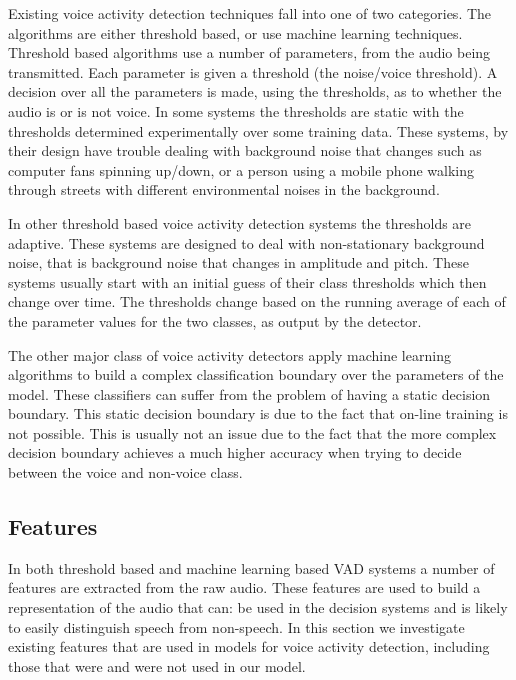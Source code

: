 \documentclass[ %
                    author={Sam Phippen},
                supervisor={Dr. Rafal Bogacz},
                     title={Real time voice activity detectors in noisy personal computing environments},
                  subtitle={},
                    degree={MEng},
                      year={2012} ]{thesis}
\begin{document}
Existing voice activity detection techniques fall into one of two categories.
The algorithms are either threshold based, or use machine learning techniques.
Threshold based algorithms use a number of parameters, from the audio being
transmitted. Each parameter is given a threshold (the noise/voice threshold). A
decision over all the parameters is made, using the thresholds, as to whether
the audio is or is not voice. In some systems the thresholds are static with
the thresholds determined experimentally over some training data\cite{haigh}.
These systems, by their design have trouble dealing with background noise that
changes such as computer fans spinning up/down, or a person using a mobile
phone walking through streets with different environmental noises in the
background.

In other threshold based voice activity detection systems the thresholds are
adaptive\cite{gokhun}. These systems are designed to deal with non-stationary
background noise, that is background noise that changes in amplitude and pitch.
These systems usually start with an initial guess of their class thresholds
which then change over time. The thresholds change based on the running average
of each of the parameter values for the two classes, as output by the
detector\cite{sakhnov}.

The other major class of voice activity detectors apply machine learning
algorithms to build a complex classification boundary over the parameters of
the model\cite{shin}. These classifiers can suffer from the problem of having a
static decision boundary. This static decision boundary is due to the fact that
on-line training is not possible. This is usually not an issue due to the fact
that the more complex decision boundary achieves a much higher accuracy when
trying to decide between the voice and non-voice class.

\subsection {Features}

In both threshold based and machine learning based VAD systems a number of
features are extracted from the raw audio. These features are used to build a
representation of the audio that can: be used in the decision systems and is
likely to easily distinguish speech from non-speech. In this section we
investigate existing features that are used in models for voice activity
detection, including those that were and were not used in our model.
\end{document}
